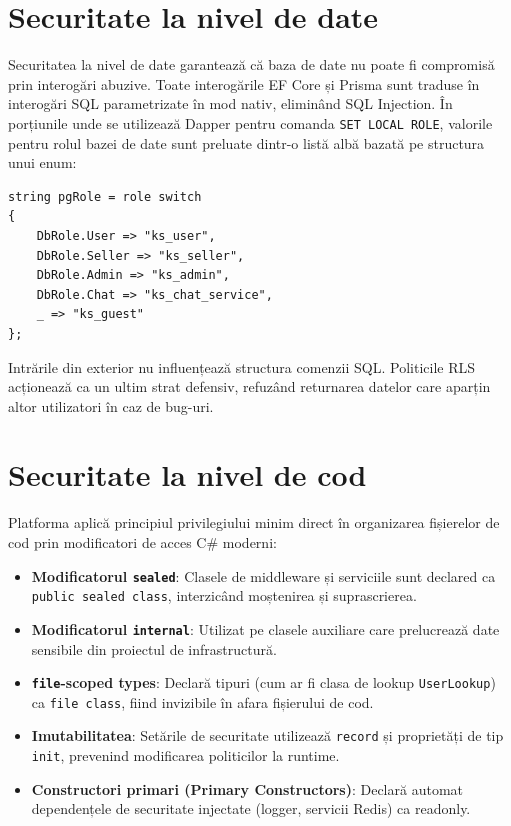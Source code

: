 \section{Securitate la nivel de date}

Securitatea la nivel de date garantează că baza de date nu poate fi compromisă prin interogări abuzive. Toate interogările EF Core și Prisma sunt traduse în interogări SQL parametrizate în mod nativ, eliminând SQL Injection. În porțiunile unde se utilizează Dapper pentru comanda \texttt{SET LOCAL ROLE}, valorile pentru rolul bazei de date sunt preluate dintr-o listă albă bazată pe structura unui enum:
\begin{lstlisting}[language={[sharp]C}]
string pgRole = role switch
{
    DbRole.User => "ks_user",
    DbRole.Seller => "ks_seller",
    DbRole.Admin => "ks_admin",
    DbRole.Chat => "ks_chat_service",
    _ => "ks_guest"
};
\end{lstlisting}

Intrările din exterior nu influențează structura comenzii SQL. Politicile RLS acționează ca un ultim strat defensiv, refuzând returnarea datelor care aparțin altor utilizatori în caz de bug-uri.

\section{Securitate la nivel de cod}

Platforma aplică principiul privilegiului minim direct în organizarea fișierelor de cod prin modificatori de acces C\# moderni:
\begin{itemize}
    \item \textbf{Modificatorul \texttt{sealed}}: Clasele de middleware și serviciile sunt declared ca \texttt{public sealed class}, interzicând moștenirea și suprascrierea.
    \item \textbf{Modificatorul \texttt{internal}}: Utilizat pe clasele auxiliare care prelucrează date sensibile din proiectul de infrastructură.
    \item \textbf{\texttt{file}-scoped types}: Declară tipuri (cum ar fi clasa de lookup \texttt{UserLookup}) ca \texttt{file class}, fiind invizibile în afara fișierului de cod.
    \item \textbf{Imutabilitatea}: Setările de securitate utilizează \texttt{record} și proprietăți de tip \texttt{init}, prevenind modificarea politicilor la runtime.
    \item \textbf{Constructori primari (Primary Constructors)}: Declară automat dependențele de securitate injectate (logger, servicii Redis) ca readonly.
\end{itemize}
